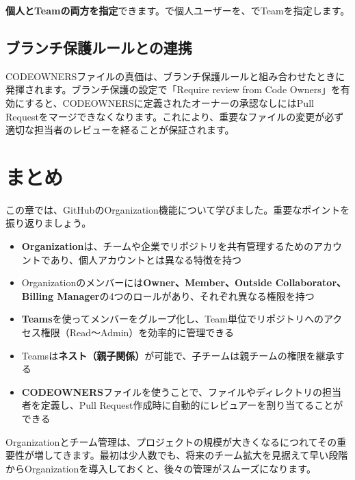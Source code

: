 \textbf{個人とTeamの両方を指定}できます。で個人ユーザーを、でTeamを指定します。

\subsection{ブランチ保護ルールとの連携}

CODEOWNERSファイルの真価は、ブランチ保護ルールと組み合わせたときに発揮されます。ブランチ保護の設定で「Require review from Code Owners」を有効にすると、CODEOWNERSに定義されたオーナーの承認なしにはPull Requestをマージできなくなります。これにより、重要なファイルの変更が必ず適切な担当者のレビューを経ることが保証されます。

\section{まとめ}

この章では、GitHubのOrganization機能について学びました。重要なポイントを振り返りましょう。

\begin{itemize}
  \item \textbf{Organization}は、チームや企業でリポジトリを共有管理するためのアカウントであり、個人アカウントとは異なる特徴を持つ
  \item Organizationのメンバーには\textbf{Owner、Member、Outside Collaborator、Billing Manager}の4つのロールがあり、それぞれ異なる権限を持つ
  \item \textbf{Teams}を使ってメンバーをグループ化し、Team単位でリポジトリへのアクセス権限（Read〜Admin）を効率的に管理できる
  \item Teamsは\textbf{ネスト（親子関係）}が可能で、子チームは親チームの権限を継承する
  \item \textbf{CODEOWNERS}ファイルを使うことで、ファイルやディレクトリの担当者を定義し、Pull Request作成時に自動的にレビュアーを割り当てることができる
\end{itemize}

Organizationとチーム管理は、プロジェクトの規模が大きくなるにつれてその重要性が増してきます。最初は少人数でも、将来のチーム拡大を見据えて早い段階からOrganizationを導入しておくと、後々の管理がスムーズになります。
